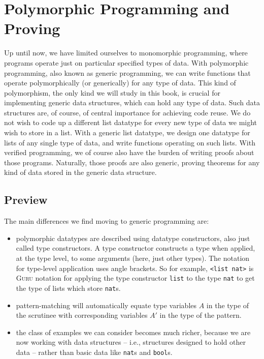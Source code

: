 \documentclass{book}[12pt]
\newcommand{\guru}[0]{\textsc{Guru}\xspace}
\begin{document}
\chapter{Polymorphic Programming and Proving}

Up until now, we have limited ourselves to monomorphic programming,
where programs operate just on particular specified types of data.
With polymorphic programming, also known as generic programming, we
can write functions that operate polymorphically (or generically) for
any type of data.  This kind of polymorphism, the only kind we will
study in this book, is crucial for implementing generic data
structures, which can hold any type of data.  Such data structures
are, of course, of central importance for achieving code reuse.  We do
not wish to code up a different list datatype for every new type of
data we might wish to store in a list.  With a generic list datatype,
we design one datatype for lists of any single type of data, and write
functions operating on such lists.  With verified programming, we of
course also have the burden of writing proofs about those programs.
Naturally, those proofs are also generic, proving theorems for any
kind of data stored in the generic data structure. 

\section{Preview}

The main differences we find moving to generic programming are:

\begin{itemize}

\item polymorphic datatypes are described using datatype constructors,
also just called type constructors.  A type constructor constructs a
type when applied, at the type level, to some arguments (here, just
other types).  The notation for type-level application uses angle
brackets.  So for example, \texttt{<list nat>} is \guru notation for
applying the type constructor \texttt{list} to the type \texttt{nat}
to get the type of lists which store \texttt{nat}s.

\item pattern-matching will automatically equate type variables $A$ in
the type of the scrutinee with corresponding variables $A'$ in the
type of the pattern.  

\item the class of examples we can consider becomes much richer,
because we are now working with data structures -- i.e., structures
designed to hold other data -- rather than basic data like
\texttt{nat}s and \texttt{bool}s.

\end{itemize}
\end{document}
